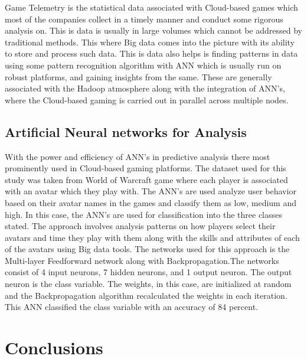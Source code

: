 \documentclass[sigconf]{acmart}
\begin{document}
Game Telemetry is the statistical data associated with Cloud-based games which most of the companies collect in a timely manner and conduct some rigorous analysis on. This is data is usually in large volumes which cannot be addressed by traditional methods. This where Big data comes into the picture with its ability to store and process such data. This is data also helps is finding patterns in data using some pattern recognition algorithm with ANN which is usually run on robust platforms, and gaining insights from the same. These are generally associated with the Hadoop atmosphere along with the integration of ANN's, where the Cloud-based gaming is carried out in parallel across multiple nodes\cite{Barros2016}.

\subsection{Artificial Neural networks for Analysis}

With the power and efficiency of ANN's in predictive analysis there most prominently used in Cloud-based gaming platforms. The dataset used for this study was taken from World of Warcraft game where each player is associated with an avatar which they play with. The ANN's are used analyze user behavior based on their avatar names in the games and classify them as low, medium and high. In this case, the ANN's are used for classification into the three classes stated. The approach involves analysis patterns on how players select their avatars and time they play with them along with the skills and attributes of each of the avatars using Big data tools. The networks used for this approach is the Multi-layer Feedforward network along with Backpropagation.The networks consist of 4 input neurons, 7 hidden neurons, and 1 output neuron. The output neuron is the class variable. The weights, in this case, are initialized at random and the Backpropagation algorithm recalculated the weights in each iteration. This ANN classified the class variable with an accuracy of 84 percent. 


\section{Conclusions}
\end{document}

